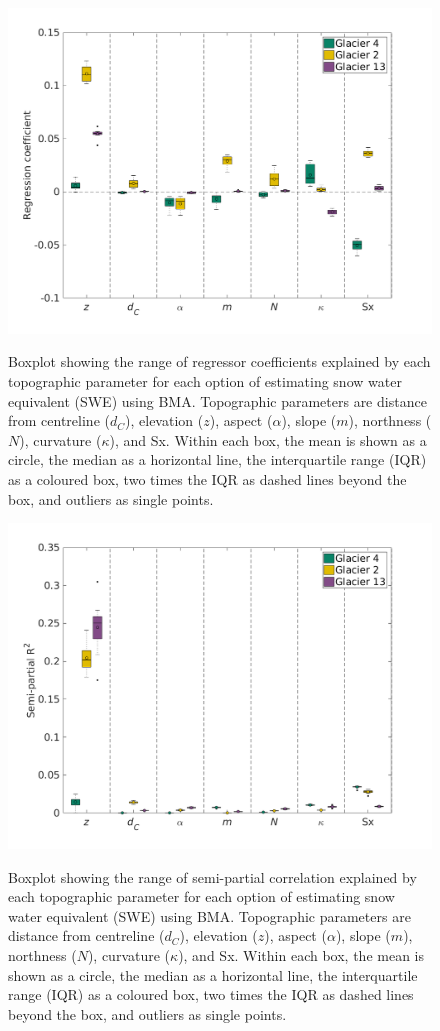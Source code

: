\documentclass{sfuthesis}
\newcommand{\params}{Topographic parameters are distance from centreline ($d_C$), elevation ($z$), aspect ($\alpha$), slope ($m$), northness ($N$), curvature ($\kappa$), and Sx. }
\newcommand{\boxplot}{Within each box, the mean is shown as a circle, the median as a horizontal line, the interquartile range (IQR) as a coloured box, two times the IQR as dashed lines beyond the box, and outliers as single points. }
\begin{document}
\begin{figure}[H]
	\centering
	\includegraphics[width =1.1 \textwidth]{BMScoeff_DensityOpts.png}\\
	\caption{Boxplot showing the range of regressor coefficients explained by each topographic parameter for each option of estimating snow water equivalent (SWE) using BMA. \params \boxplot }
	\label{fig:BMAcoeff_densityOptions}
\end{figure}


\begin{figure}[H]
	\centering
	\includegraphics[width =1.1 \textwidth]{BMSsemiR2_DensityOpts.png}\\
	\caption{Boxplot showing the range of semi-partial correlation explained by each topographic parameter for each option of estimating snow water equivalent (SWE) using BMA. \params \boxplot }
	\label{fig:BMAsemiR2_densityOptions}
\end{figure} 
\end{document}
